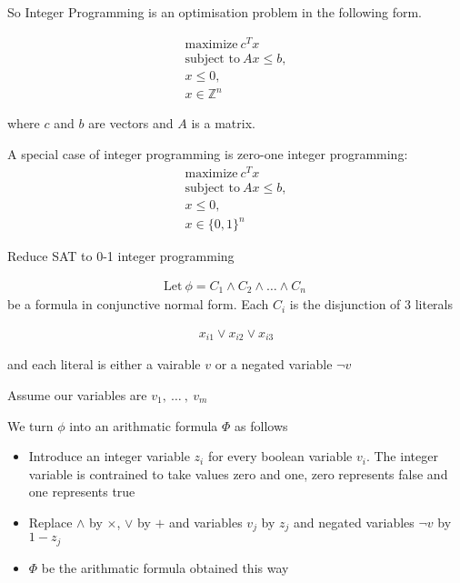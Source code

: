 \documentclass[mathserif]{beamer}
\begin{document}
\begin{frame}
So Integer Programming is an optimisation problem in the following form.

\begin{align*}
\text{maximize}\ c^Tx\\
\text{subject to}\ Ax \leq b,\\
x \leq 0,\\
x \in \mathbb{Z}^n
\end{align*}

where $c$ and $b$ are vectors and $A$ is a matrix.

\end{frame}
\begin{frame}

A special case of integer programming is zero-one integer programming:
\begin{align*}
\text{maximize}\ c^Tx\\
\text{subject to}\ Ax \leq b,\\
x \leq 0,\\
x \in \{0, 1\}^n
\end{align*}
\end{frame}

Reduce SAT to 0-1 integer programming

\begin{align*}
\text{Let}\ \phi = C_1 \wedge C_2 \wedge \ldots \wedge C_n\
\end{align*}
be a formula in conjunctive normal form. Each $C_i$ is the disjunction of 3 literals

\begin{align*}
x_{i1} \vee x_{i2} \vee x_{i3}
\end{align*}

and each literal is either a vairable $v$ or a negated variable $\neg v$

Assume our variables are $v_1,\ \ldots\ ,\ v_m$

\begin{frame}
We turn $\phi$ into an arithmatic formula $\Phi$ as follows
\begin{itemize}
\item Introduce an integer variable $z_i$ for every boolean variable $v_i$. The integer variable is contrained to take values zero and one, zero represents false and one represents true
\item Replace $\wedge$ by $\times$, $\vee$ by $+$ and variables $v_j$ by $z_j$ and negated variables $\neg v$ by $1 - z_j$
\item $\Phi$ be the arithmatic formula obtained this way
\end{itemize}
\end{frame}
\end{document}
